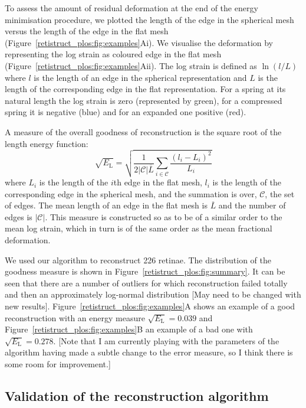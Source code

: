 \documentclass[10pt]{article}
\newcommand{\todo}[1]{{\color{red}[#1]}}
\begin{document}
To assess the amount of residual deformation at the end of the energy
minimisation procedure, we plotted the length of the edge in the
spherical mesh versus the length of the edge in the flat mesh
(Figure~\ref{retistruct_plos:fig:examples}Ai). We visualise the
deformation by representing the log strain as coloured edge in the
flat mesh (Figure~\ref{retistruct_plos:fig:examples}Aii). The log
strain is defined as $\ln(l/L)$ where $l$ is the length of an edge in
the spherical representation and $L$ is the length of the
corresponding edge in the flat representation. For a spring at its
natural length the log strain is zero (represented by green), for a
compressed spring it is negative (blue) and for an expanded one
positive (red).

A measure of the overall goodness of reconstruction is the square root
of the length energy function:
\begin{equation} 
  \sqrt{E_\mathrm{L}} = \sqrt{\frac{1}{2|\mathcal{C}|\overline{L}}
  \sum_{i\in\mathcal{C}} \frac{(l_i - L_i)^2}{L_i}}
\end{equation} 
where $L_i$ is the length of the $i$th edge in the flat mesh, $l_i$ is
the length of the corresponding edge in the spherical mesh, and the
summation is over, $\mathcal{C}$, the set of edges. The mean length of
an edge in the flat mesh is $\overline{L}$ and the number of edges is
$|\mathcal{C}|$. This measure is constructed so as to be of a similar
order to the mean log strain, which in turn is of the same order as
the mean fractional deformation.  

We used our algorithm to reconstruct 226 retinae. The distribution of
the goodness measure is shown in
Figure~\ref{retistruct_plos:fig:summary}. It can be seen that there
are a number of outliers for which reconstruction failed totally and
then an approximately log-normal distribution
\todo{May need to be changed with new
  results}.
Figure~\ref{retistruct_plos:fig:examples}A shows an example of a good
reconstruction with an energy measure $\sqrt{E_\mathrm{L}}=0.039$ and
Figure~\ref{retistruct_plos:fig:examples}B an example of a bad one
with $\sqrt{E_\mathrm{L}}=0.278$.
\todo{Note that I am currently playing with the parameters of the
  algorithm having made a subtle change to the error measure, so I
  think there is some room for improvement.}

\subsection*{Validation of the reconstruction algorithm}
\end{document}
